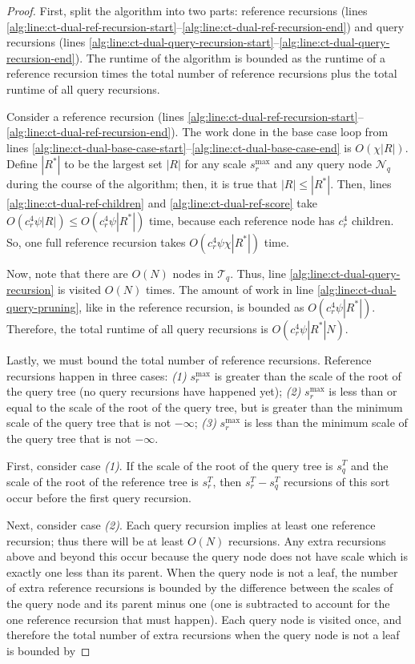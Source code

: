 \begin{proof}
First, split the algorithm into two parts: reference recursions (lines
\ref{alg:line:ct-dual-ref-recursion-start}--\ref{alg:line:ct-dual-ref-recursion-end})
and query recursions (lines
\ref{alg:line:ct-dual-query-recursion-start}--\ref{alg:line:ct-dual-query-recursion-end}).
The runtime of the algorithm is bounded as the runtime of a reference recursion
times the total number of reference recursions plus the total runtime of all
query recursions.

Consider a reference recursion (lines
\ref{alg:line:ct-dual-ref-recursion-start}--\ref{alg:line:ct-dual-ref-recursion-end}).
The work done in the base case loop from lines
\ref{alg:line:ct-dual-base-case-start}--\ref{alg:line:ct-dual-base-case-end} is
$O(\chi | R |)$.  Define $| R^* |$ to be the largest set $|R|$ for any scale
$s_r^{\max}$ and any query node $\mathscr{N}_q$ during the course of the
algorithm; then, it is true that $| R | \le | R^* |$.
%
Then, lines \ref{alg:line:ct-dual-ref-children} and
\ref{alg:line:ct-dual-ref-score} take $O(c_r^4 \psi | R |) \le O(c_r^4 \psi |
R^* |)$ time, because each reference node has $c_r^4$ children.  So, one
full reference recursion takes $O(c_r^4 \psi \chi | R^* |)$ time.

Now, note that there are $O(N)$ nodes in $\mathscr{T}_q$.  Thus, line
\ref{alg:line:ct-dual-query-recursion} is visited $O(N)$ times.  The amount of
work in line \ref{alg:line:ct-dual-query-pruning}, like in the reference
recursion, is bounded as $O(c_r^4 \psi | R^* |)$. Therefore, the total
runtime of all query recursions is $O(c_r^4 \psi | R^* | N)$.

Lastly, we must bound the total number of reference recursions.  Reference
recursions happen in three cases: \textit{(1)} $s_r^{\max}$ is greater than the
scale of the root of the query tree (no query recursions have happened yet);
\textit{(2)} $s_r^{\max}$ is less than or equal to the scale of the root of the
query tree, but is greater than the minimum scale of the query tree that is not
$-\infty$; \textit{(3)} $s_r^{\max}$ is less than the minimum scale of the query
tree that is not $-\infty$.

First, consider case \textit{(1)}.  If the scale of the root of the query tree
is $s_q^T$ and the scale of the root of the reference tree is $s_r^T$, then
$s_r^T - s_q^T$ recursions of this sort occur before the first query recursion.

Next, consider case \textit{(2)}.  Each query recursion implies at least one
reference recursion; thus there will be at least $O(N)$ recursions.  Any
extra recursions above and beyond this occur because the query node does not
have scale which is exactly one less than its parent.  When the query node is
not a leaf, the number of extra reference recursions is bounded by the
difference between the scales of the query node and its parent minus one (one is
subtracted to account for the one reference recursion that must happen).  Each
query node is visited once, and therefore the total number of extra recursions
when the query node is not a leaf is bounded by


\end{proof}

